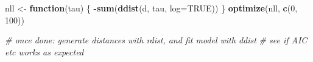 \documentclass[12pt,]{book}
\newenvironment{Shaded}{\begin{snugshade}}{\end{snugshade}}
\newcommand{\CommentTok}[1]{\textcolor[rgb]{0.56,0.35,0.01}{\textit{#1}}}
\newcommand{\ControlFlowTok}[1]{\textcolor[rgb]{0.13,0.29,0.53}{\textbf{#1}}}
\newcommand{\DataTypeTok}[1]{\textcolor[rgb]{0.13,0.29,0.53}{#1}}
\newcommand{\DecValTok}[1]{\textcolor[rgb]{0.00,0.00,0.81}{#1}}
\newcommand{\KeywordTok}[1]{\textcolor[rgb]{0.13,0.29,0.53}{\textbf{#1}}}
\newcommand{\NormalTok}[1]{#1}
\newcommand{\OperatorTok}[1]{\textcolor[rgb]{0.81,0.36,0.00}{\textbf{#1}}}
\newcommand{\OtherTok}[1]{\textcolor[rgb]{0.56,0.35,0.01}{#1}}
\newcommand{\StringTok}[1]{\textcolor[rgb]{0.31,0.60,0.02}{#1}}
\begin{document}
\begin{Shaded}
\begin{Highlighting}[]
\NormalTok{nll <-}\StringTok{ }\ControlFlowTok{function}\NormalTok{(tau) \{}
  \OperatorTok{-}\KeywordTok{sum}\NormalTok{(}\KeywordTok{ddist}\NormalTok{(d, tau, }\DataTypeTok{log=}\OtherTok{TRUE}\NormalTok{))}
\NormalTok{\}}
\KeywordTok{optimize}\NormalTok{(nll, }\KeywordTok{c}\NormalTok{(}\DecValTok{0}\NormalTok{, }\DecValTok{100}\NormalTok{))}


\CommentTok{# once done: generate distances with rdist, and fit model with ddist}
\CommentTok{# see if AIC etc works as expected}
\end{Highlighting}
\end{Shaded}


\end{document}
